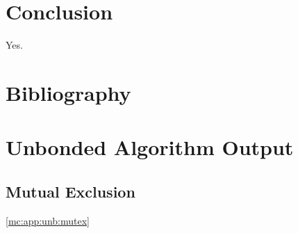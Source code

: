 \documentclass{llncs}
\begin{document}
\section{Conclusion}

Yes.

\section{Bibliography}




\appendix

\section{Unbonded Algorithm Output}

\subsection{Mutual Exclusion}
\ref{mc:app:unb:mutex}
\end{document}
